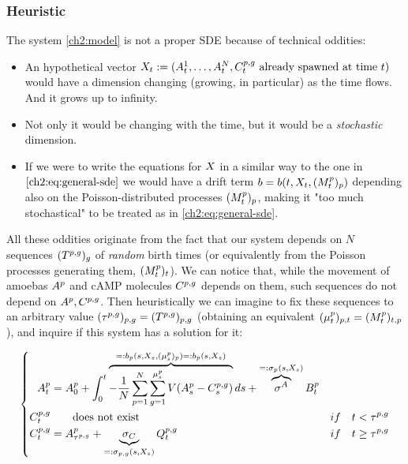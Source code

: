 \subsubsection{Heuristic}

The system \ref{ch2:model} is not a proper SDE because of technical oddities:
\begin{itemize}
\item An hypothetical vector $X_t := (A_t^1,\ldots, A_t^N, C_t^{p,g} \text{ already spawned at time }t)$ would have a dimension changing (growing, in particular) as the time flows.
And it grows up to infinity.
\item Not only it would be changing with the time, but it would be a \emph{stochastic} dimension.
\item If we were to write the equations for $X$ in a similar way to the one in $\ref{ch2:eq:general-sde}$ we would have a drift term $b = b(t, X_t, (M_t^p)_p)$ depending also on the Poisson-distributed processes $(M_t^p)_p$, making it "too much stochastical" to be treated as in \ref{ch2:eq:general-sde}.
\end{itemize}

All these oddities originate from the fact that our system depends on $N$ sequences $(T^{p,g})_{g}$ of \emph{random} birth times (or equivalently from the Poisson processes generating them, \ie $(M_t^p)_t$).
We can notice that, while the movement of amoebas $A^p$ and cAMP molecules $C^{p,g}$ depends on them, such sequences do not depend on $A^p, C^{p,g}$.
Then heuristically we can imagine to fix these sequences to an arbitrary value $(\tau^{p,g})_{p,g} = (T^{p,g})_{p,g}$ (obtaining an equivalent $(\mu_t^p)_{p,t}=(M_t^p)_{t,p}$), and inquire if this system has a solution for it:

\begin{equation}
\left\{
\begin{aligned}
A_t^p 
&= A_0^p 
+ \int_0^t 
	\overbrace{
		- \frac{1}{N} \sum _{p = 1}^{N} \sum_{g = 1}^{\mu_s^p} V(A_s^p - C_s^{p,g})
	}^{=:b_p(s, X_s, (\mu_s^p)_p)=:b_p(s, X_s)} 
d s
+ 
\overbrace{\sigma^A}^{=:\sigma_p(s,X_s)} B_t^p
&
\\
C_t^{p,g} 
&\qquad\text{does not exist} 
&if \quad t < \tau^{p,g}
\\
C_t^{p,g}
&= A_{\tau^{p,g}}^p + \underbrace{\sigma_C}_{=:\sigma_{p,g}(s,X_s)} Q_t^{p,g}
&if \quad t \geq \tau^{p,g}
\end{aligned}
\right.
\end{equation}\label{ch2:system:heuristic-fixed-times}

